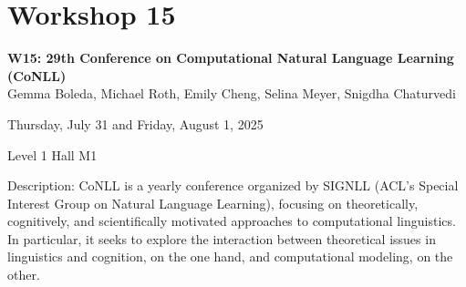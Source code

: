 \clearpage


\section[W15: 29th Conference on Computational Natural Language Learning (CoNLL)]{Workshop 15}
\label{workshop_15_1}
\label{workshop_15_2}

\begin{center}
    {\Large \textbf{W15: 29th Conference on Computational Natural Language Learning (CoNLL)}}\\

    Gemma Boleda, Michael Roth, Emily Cheng, Selina Meyer, Snigdha Chaturvedi
    
    Thursday, July 31 and Friday, August 1, 2025
    
    Level 1 Hall M1

\end{center}

Description: CoNLL is a yearly conference organized by SIGNLL (ACL's Special Interest Group on Natural Language Learning), focusing on theoretically, cognitively, and scientifically motivated approaches to computational linguistics.  In particular, it seeks to explore the interaction between theoretical issues in linguistics and cognition, on the one hand, and computational modeling, on the other.


